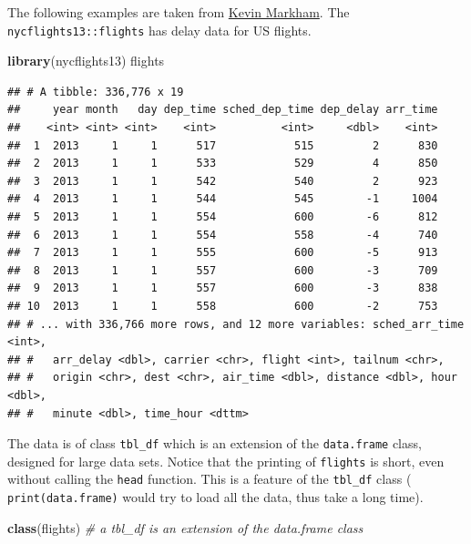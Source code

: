 \documentclass[]{book}
\newenvironment{Shaded}{\begin{snugshade}}{\end{snugshade}}
\newcommand{\KeywordTok}[1]{\textcolor[rgb]{0.13,0.29,0.53}{\textbf{#1}}}
\newcommand{\CommentTok}[1]{\textcolor[rgb]{0.56,0.35,0.01}{\textit{#1}}}
\newcommand{\NormalTok}[1]{#1}
\theoremstyle{definition}
\theoremstyle{definition}
\theoremstyle{definition}
\theoremstyle{remark}
\begin{document}
The following examples are taken from
\href{https://github.com/justmarkham/dplyr-tutorial/blob/master/dplyr-tutorial.Rmd}{Kevin
Markham}. The \texttt{nycflights13::flights} has delay data for US
flights.

\begin{Shaded}
\begin{Highlighting}[]
\KeywordTok{library}\NormalTok{(nycflights13)}
\NormalTok{flights}
\end{Highlighting}
\end{Shaded}

\begin{verbatim}
## # A tibble: 336,776 x 19
##     year month   day dep_time sched_dep_time dep_delay arr_time
##    <int> <int> <int>    <int>          <int>     <dbl>    <int>
##  1  2013     1     1      517            515         2      830
##  2  2013     1     1      533            529         4      850
##  3  2013     1     1      542            540         2      923
##  4  2013     1     1      544            545        -1     1004
##  5  2013     1     1      554            600        -6      812
##  6  2013     1     1      554            558        -4      740
##  7  2013     1     1      555            600        -5      913
##  8  2013     1     1      557            600        -3      709
##  9  2013     1     1      557            600        -3      838
## 10  2013     1     1      558            600        -2      753
## # ... with 336,766 more rows, and 12 more variables: sched_arr_time <int>,
## #   arr_delay <dbl>, carrier <chr>, flight <int>, tailnum <chr>,
## #   origin <chr>, dest <chr>, air_time <dbl>, distance <dbl>, hour <dbl>,
## #   minute <dbl>, time_hour <dttm>
\end{verbatim}

The data is of class \texttt{tbl\_df} which is an extension of the
\texttt{data.frame} class, designed for large data sets. Notice that the
printing of \texttt{flights} is short, even without calling the
\texttt{head} function. This is a feature of the \texttt{tbl\_df} class
( \texttt{print(data.frame)} would try to load all the data, thus take a
long time).

\begin{Shaded}
\begin{Highlighting}[]
\KeywordTok{class}\NormalTok{(flights) }\CommentTok{# a tbl_df is an extension of the data.frame class}
\end{Highlighting}
\end{Shaded}
\end{document}
